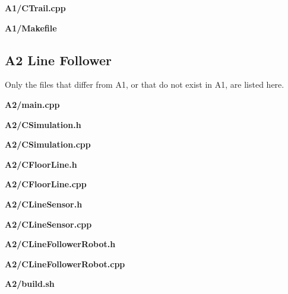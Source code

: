 \documentclass[10pt]{article}
\begin{document}
\noindent\textbf{\ttfamily\small A1/CTrail.cpp}


\noindent\textbf{\ttfamily\small A1/Makefile}


\newpage

\subsection*{A2 Line Follower}

Only the files that differ from A1, or that do not exist in A1, are listed
here.

\noindent\textbf{\ttfamily\small A2/main.cpp}


\noindent\textbf{\ttfamily\small A2/CSimulation.h}


\noindent\textbf{\ttfamily\small A2/CSimulation.cpp}


\noindent\textbf{\ttfamily\small A2/CFloorLine.h}


\noindent\textbf{\ttfamily\small A2/CFloorLine.cpp}


\noindent\textbf{\ttfamily\small A2/CLineSensor.h}


\noindent\textbf{\ttfamily\small A2/CLineSensor.cpp}


\noindent\textbf{\ttfamily\small A2/CLineFollowerRobot.h}


\noindent\textbf{\ttfamily\small A2/CLineFollowerRobot.cpp}


\noindent\textbf{\ttfamily\small A2/build.sh}


\newpage

\endgroup
\end{document}
